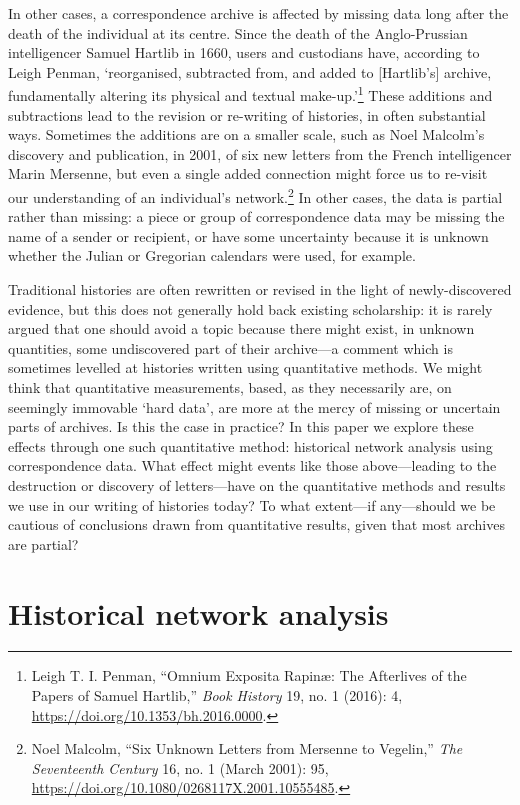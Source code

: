 \documentclass[]{article}
\begin{document}
In other cases, a correspondence archive is affected by missing data long after the death of the individual at its centre. Since the death of the Anglo-Prussian intelligencer Samuel Hartlib in 1660, users and custodians have, according to Leigh Penman, `reorganised, subtracted from, and added to {[}Hartlib's{]} archive, fundamentally altering its physical and textual make-up.'\footnote{Leigh T. I. Penman, ``Omnium Exposita Rapinæ: The Afterlives of the Papers of Samuel Hartlib,'' \emph{Book History} 19, no. 1 (2016): 4, \url{https://doi.org/10.1353/bh.2016.0000}.} These additions and subtractions lead to the revision or re-writing of histories, in often substantial ways. Sometimes the additions are on a smaller scale, such as Noel Malcolm's discovery and publication, in 2001, of six new letters from the French intelligencer Marin Mersenne, but even a single added connection might force us to re-visit our understanding of an individual's network.\footnote{Noel Malcolm, ``Six Unknown Letters from Mersenne to Vegelin,'' \emph{The Seventeenth Century} 16, no. 1 (March 2001): 95, \url{https://doi.org/10.1080/0268117X.2001.10555485}.} In other cases, the data is partial rather than missing: a piece or group of correspondence data may be missing the name of a sender or recipient, or have some uncertainty because it is unknown whether the Julian or Gregorian calendars were used, for example.

Traditional histories are often rewritten or revised in the light of newly-discovered evidence, but this does not generally hold back existing scholarship: it is rarely argued that one should avoid a topic because there might exist, in unknown quantities, some undiscovered part of their archive---a comment which is sometimes levelled at histories written using quantitative methods. We might think that quantitative measurements, based, as they necessarily are, on seemingly immovable `hard data', are more at the mercy of missing or uncertain parts of archives. Is this the case in practice? In this paper we explore these effects through one such quantitative method: historical network analysis using correspondence data. What effect might events like those above---leading to the destruction or discovery of letters---have on the quantitative methods and results we use in our writing of histories today? To what extent---if any---should we be cautious of conclusions drawn from quantitative results, given that most archives are partial?

\hypertarget{historical-network-analysis}{%
\section{Historical network analysis}\label{historical-network-analysis}}
\end{document}

